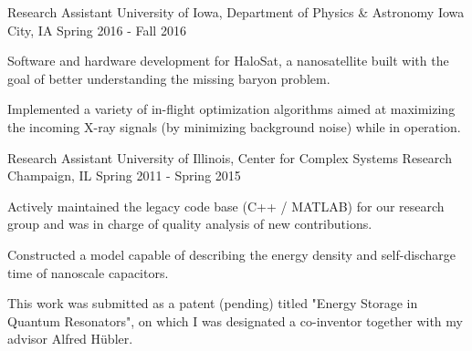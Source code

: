 \begin{cventries}
\cventry
  {Research Assistant} %
  {University of Iowa, Department of Physics \& Astronomy} %
  {Iowa City, IA} %
  {Spring 2016 - Fall 2016} %
  {
      \begin{cvitems} %
          \item {Software and hardware development for HaloSat, a
                  nanosatellite built with the goal of better understanding
                  the missing baryon problem.}
          \item {Implemented a variety of in-flight optimization algorithms aimed at
                  maximizing the incoming X-ray signals (by minimizing
                  background noise) while in operation.}
      \end{cvitems}
  }

  \cventry
  {Research Assistant} %
  {University of Illinois, Center for Complex Systems Research} %
  {Champaign, IL}
  {Spring 2011 - Spring 2015}
  {
      \begin{cvitems} 
          \item {Actively maintained the legacy code base (C++ / MATLAB) for our
                  research group and was in charge of quality analysis of new contributions.}
          \item {Constructed a model capable of describing the energy density and
                  self-discharge time of nanoscale capacitors.}
          \item {This work was submitted as a patent (pending) titled "Energy
                  Storage in Quantum Resonators", on which I was designated a
                  co-inventor together with my advisor Alfred H\"ubler.}
      \end{cvitems}
  }

\end{cventries}
